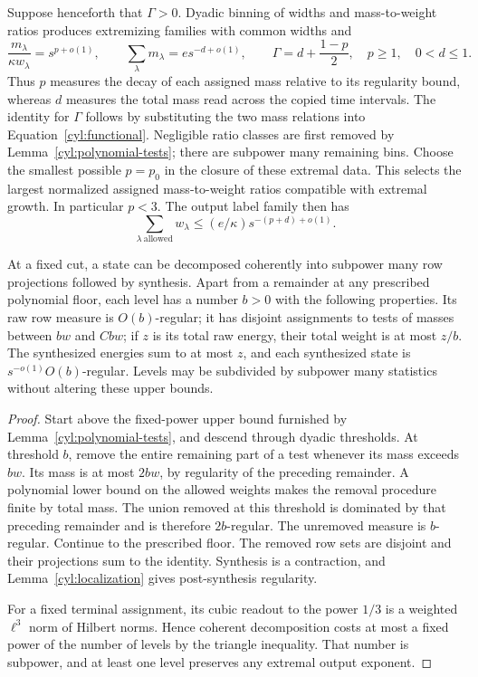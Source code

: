 Suppose henceforth that $\Gamma>0$.  Dyadic binning of widths and
mass-to-weight ratios produces extremizing families with common widths
and
\begin{equation}\label{cyl:pd}
 \frac{m_\lambda}{\kappa w_\lambda}=s^{p+o(1)},\qquad
 \sum_\lambda m_\lambda=e s^{-d+o(1)},\qquad
 \Gamma=d+\frac{1-p}{2},\quad p\ge1,\quad0<d\le1.
\end{equation}
Thus $p$ measures the decay of each assigned mass relative to its
regularity bound, whereas $d$ measures the total mass read across the
copied time intervals. The identity for $\Gamma$ follows by substituting
the two mass relations into Equation~\eqref{cyl:functional}.
Negligible ratio classes are first removed by
Lemma~\ref{cyl:polynomial-tests}; there are subpower many remaining bins.
Choose the smallest possible $p=p_0$ in the closure of these extremal
data. This selects the largest normalized assigned mass-to-weight ratios
compatible with extremal growth. In particular $p<3$. The output label
family then has
\begin{equation}\label{cyl:terminal-count}
 \sum_{\lambda\ \mathrm{allowed}}w_\lambda
       \le(e/\kappa)s^{-(p+d)+o(1)}.
\end{equation}

\begin{lemma}\label{cyl:peeling}
At a fixed cut, a state can be decomposed coherently into subpower many
row projections followed by synthesis.  Apart from a remainder at any
prescribed polynomial floor, each level has a number $b>0$ with the
following properties.  Its raw row measure is $O(b)$-regular; it has
disjoint assignments to tests of masses between $b w$ and $C b w$; if
$z$ is its total raw energy, their total weight is at most $z/b$.
The synthesized energies sum to at most $z$, and each synthesized state
is $s^{-o(1)}O(b)$-regular.  Levels may be subdivided by subpower many
statistics without altering these upper bounds.
\end{lemma}

\begin{proof}
Start above the fixed-power upper bound furnished by
Lemma~\ref{cyl:polynomial-tests}, and descend through dyadic thresholds.
At threshold $b$, remove the entire remaining part of a test whenever its
mass exceeds $bw$.  Its mass is at most $2bw$, by regularity of the
preceding remainder.  A polynomial lower bound on the allowed weights
makes the removal procedure finite by total mass.  The union removed at
this threshold is dominated by that preceding remainder and is therefore
$2b$-regular.  The unremoved measure is $b$-regular.  Continue to the
prescribed floor.  The removed row sets are disjoint and their projections
sum to the identity.  Synthesis is a contraction, and
Lemma~\ref{cyl:localization} gives post-synthesis regularity.

For a fixed terminal assignment, its cubic readout to the power $1/3$
is a weighted $\ell^3$ norm of Hilbert norms.  Hence coherent decomposition
costs at most a fixed power of the number of levels by the triangle
inequality.  That number is subpower, and at least one level preserves
any extremal output exponent.
\end{proof}

